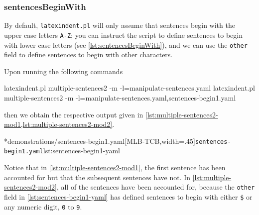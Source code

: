 \subsubsection{sentencesBeginWith}
	By default, \texttt{latexindent.pl} will only assume that sentences begin with the
	upper case letters \texttt{A-Z}; you can instruct the script to define
	sentences to begin with lower case letters (see \cref{lst:sentencesBeginWith}), and we can
	use the \texttt{other} field to define sentences to begin with other
	characters.


	Upon running the following commands
	\begin{widepage}
		\begin{commandshell}
latexindent.pl multiple-sentences2 -m -l=manipulate-sentences.yaml
latexindent.pl multiple-sentences2 -m -l=manipulate-sentences.yaml,sentences-begin1.yaml
	\end{commandshell}
	\end{widepage}
	then we obtain the respective output given in \cref{lst:multiple-sentences2-mod1,lst:multiple-sentences2-mod2}.

        \begin{cmhtcbraster}[
            raster force size=false,
            raster column 1/.style={add to width=1cm},
           ]
		\cmhlistingsfromfile[style=yaml-LST]*{demonstrations/sentences-begin1.yaml}[MLB-TCB,width=.45\textwidth]{\texttt{sentences-begin1.yaml}}{lst:sentences-begin1-yaml}
        \end{cmhtcbraster}
	Notice that in \cref{lst:multiple-sentences2-mod1}, the first sentence has been accounted for but
	that the subsequent sentences have not. In \cref{lst:multiple-sentences2-mod2}, all of the
	sentences have been accounted for, because the \texttt{other} field in
	\cref{lst:sentences-begin1-yaml} has defined sentences to begin with either
	\lstinline!$! or any numeric digit, \texttt{0} to
	\texttt{9}.

